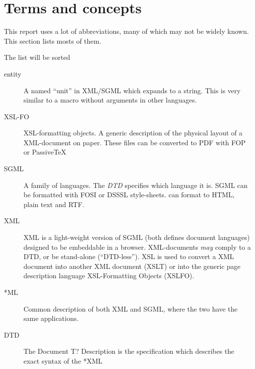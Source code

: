 
\chapter{Terms and concepts}
\label{cha:terms-and-concepts}



This report uses a lot of abbreviations, many of which may not be
widely known.  This section lists mosts of them.


\textsf{The list will be sorted}
\begin{description}

\item[entity] A named ``unit'' in XML/SGML which expands to a string.
  This is very similar to a macro without arguments in other
  languages.
  
\item[XSL-FO] XSL-formatting objects.  A generic description of the physical
  layout of a XML-document on paper.  These files can be converted to
  PDF with FOP or PassiveTeX
  
\item[SGML] A family of languages.  The \textit{DTD} specifies which
  language it is.  SGML can be formatted with FOSI or DSSSL
  style-sheets.   can format to HTML, plain text and
  RTF. 
  
\item[XML]
  
XML is a light-weight version of SGML (both defines document
languages) designed to be embeddable in a browser.  XML-documents
\textit{may} comply to a DTD, or be stand-alone (``DTD-less'').  XSL
is used to convert a XML document into another XML document (XSLT) or
into the generic page description language XSL-Formatting Objects
(XSLFO).


\item[*ML] Common description of both XML and SGML, where the two have
  the same applications.

\item[DTD] The \textsf{Document T? Description} is the specification
  which describes the exact syntax of the *XML



\end{description}

